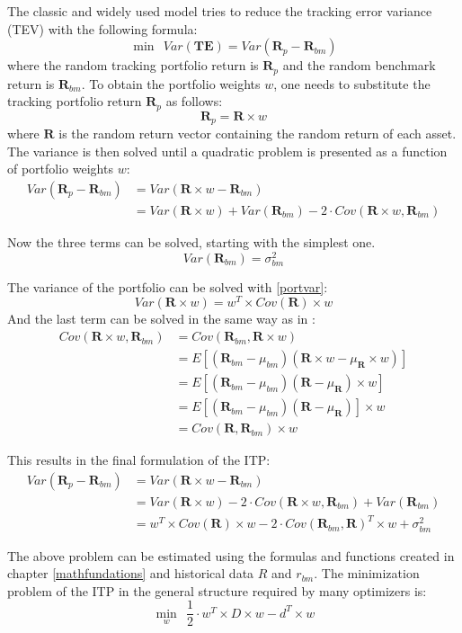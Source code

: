 \documentclass[
  oneside]{book}
\begin{document}
The classic and widely used model tries to reduce the tracking error variance (TEV) with the following formula:
\[
 \min \ \ Var(\pmb{TE}) = Var(\pmb{R}_{p}-\pmb{R}_{bm})
\]
where the random tracking portfolio return is \(\pmb{R}_{p}\) and the random benchmark return is \(\pmb{R}_{bm}\). To obtain the portfolio weights \(w\), one needs to substitute the tracking portfolio return \(\pmb{R}_{p}\) as follows:
\[
  \pmb{R}_{p} = \pmb{R} \times w
\]
where \(\pmb{R}\) is the random return vector containing the random return of each asset. The variance is then solved until a quadratic problem is presented as a function of portfolio weights \(w\):
\begin{align*}
 Var(\pmb{R}_{p}-\pmb{R}_{bm}) &= Var(\pmb{R} \times w - \pmb{R}_{bm}) \\
 &= Var(\pmb{R} \times w) + Var(\pmb{R}_{bm}) - 2 \cdot Cov(\pmb{R} \times w,\pmb{R}_{bm}) 
\end{align*}

Now the three terms can be solved, starting with the simplest one.
\[
Var(\pmb{R}_{bm}) = \sigma_{bm}^2
\]

The variance of the portfolio can be solved with \ref{portvar}:
\[
Var(\pmb{R} \times w) = w^T \times Cov(\pmb{R}) \times w
\]
And the last term can be solved in the same way as in \citep{Eric2021}:
\begin{align*}
  Cov(\pmb{R} \times w, \pmb{R}_{bm}) &= Cov(\pmb{R}_{bm}, \pmb{R} \times w) \\
  &= E[(\pmb{R}_{bm}-\mu_{bm})(\pmb{R} \times w-\mu_{\pmb{R}} \times w)] \\
  &= E[(\pmb{R}_{bm}-\mu_{bm})(\pmb{R}-\mu_{\pmb{R}}) \times w] \\
  &= E[(\pmb{R}_{bm}-\mu_{bm})(\pmb{R}-\mu_{\pmb{R}})] \times w \\
  &= Cov(\pmb{R},\pmb{R}_{bm}) \times w
\end{align*}

This results in the final formulation of the ITP:
\begin{align*}
  Var(\pmb{R}_{p}-\pmb{R}_{bm}) & = Var(\pmb{R} \times w - \pmb{R}_{bm}) \\
  & = Var(\pmb{R} \times w) - 2 \cdot Cov(\pmb{R} \times w,\pmb{R}_{bm}) + Var(\pmb{R}_{bm})  \\
  & = w^T \times Cov(\pmb{R}) \times w - 2 \cdot Cov(\pmb{R}_{bm}, \pmb{R})^T \times w + \sigma_{bm}^2
  \label{eq:ITP}
\end{align*}

The above problem can be estimated using the formulas and functions created in chapter \ref{mathfundations} and historical data \(R\) and \(r_{bm}\). The minimization problem of the ITP in the general structure required by many optimizers is:
\[
  \min\limits_{w} \ \ \frac{1}{2} \cdot w^T \times D \times w -d^T \times w
\]
\end{document}
